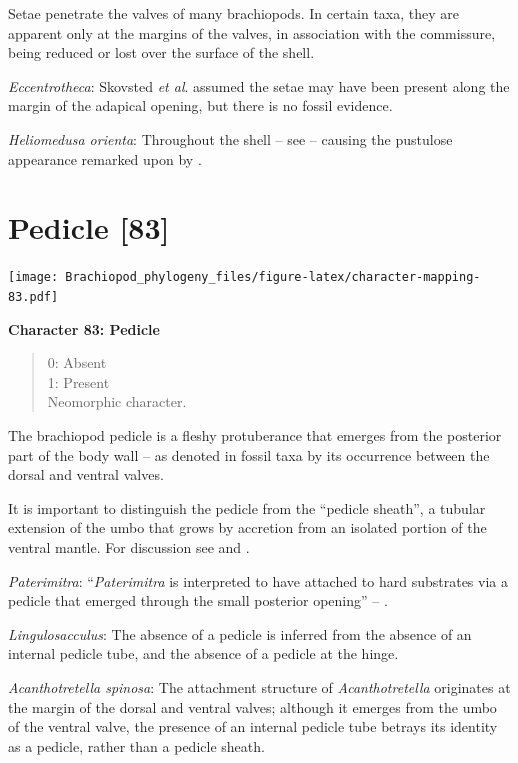 \documentclass[]{book}
\theoremstyle{definition}
\theoremstyle{definition}
\theoremstyle{definition}
\theoremstyle{remark}
\begin{document}
Setae penetrate the valves of many brachiopods. In certain taxa, they
are apparent only at the margins of the valves, in association with the
commissure, being reduced or lost over the surface of the shell.

\emph{Eccentrotheca}: Skovsted \emph{et al}.
\citeyearpar{Skovsted2011Scleritomeconstruction} assumed the setae may
have been present along the margin of the adapical opening, but there is
no fossil evidence.

\emph{Heliomedusa orienta}: Throughout the shell -- see
\citet{Williams2007PartH} -- causing the pustulose appearance remarked
upon by \citet{Chen2007Reinterpretationof}.

\hypertarget{pedicle-83}{%
\section{Pedicle {[}83{]}}\label{pedicle-83}}

\texttt{[image: Brachiopod\_phylogeny\_files/figure-latex/character-mapping-83.pdf]}

\textbf{Character 83: Pedicle}

\begin{quote}
0: Absent\\
1: Present\\
Neomorphic character.
\end{quote}

The brachiopod pedicle is a fleshy protuberance that emerges from the
posterior part of the body wall -- as denoted in fossil taxa by its
occurrence between the dorsal and ventral valves.

It is important to distinguish the pedicle from the ``pedicle sheath'',
a tubular extension of the umbo that grows by accretion from an isolated
portion of the ventral mantle. For discussion see
\citet{Holmer2018Theattachment} and \citet{Bassett2017Earliestontogeny}.

\emph{Paterimitra}: ``\emph{Paterimitra} is interpreted to have attached
to hard substrates via a pedicle that emerged through the small
posterior opening'' -- \citet{Skovsted2009Thescleritome}.

\emph{Lingulosacculus}: The absence of a pedicle is inferred from the
absence of an internal pedicle tube, and the absence of a pedicle at the
hinge.

\emph{Acanthotretella spinosa}: The attachment structure of
\emph{Acanthotretella} originates at the margin of the dorsal and
ventral valves; although it emerges from the umbo of the ventral valve,
the presence of an internal pedicle tube betrays its identity as a
pedicle, rather than a pedicle sheath.
\end{document}
